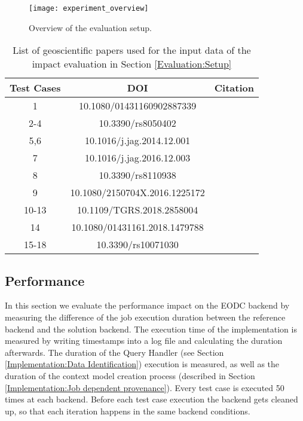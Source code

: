 \documentclass[draft,final]{vutinfth} %
\begin{document}
\begin{figure}[h]
	\centering
	\texttt{[image: experiment\_overview]}
	\caption{Overview of the evaluation setup.}
	\label{fig:experiment_overview} %
\end{figure}

\begin{table}[]
	\caption{List of geoscientific papers used for the input data of the impact evaluation in Section \ref{Evaluation:Setup}}
	\centering
	\begin{tabular}{c|c|c}
		\textbf{Test Cases} & \textbf{DOI} & \textbf{Citation}  \\ \hline
		1 & 10.1080/01431160902887339 & \cite{evaluation1} \\ 
		2-4 & 10.3390/rs8050402 & \cite{evaluation2} \\ 
		5,6 & 10.1016/j.jag.2014.12.001  & \cite{evaluation3} \\
		7 & 10.1016/j.jag.2016.12.003  & \cite{evaluation4} \\
		8 & 10.3390/rs8110938  & \cite{evaluation5} \\
		9 & 10.1080/2150704X.2016.1225172  & \cite{evaluation6} \\
		10-13 & 10.1109/TGRS.2018.2858004  & \cite{evaluation7} \\
		14 & 10.1080/01431161.2018.1479788  & \cite{evaluation8} \\
		15-18 & 10.3390/rs10071030  & \cite{evaluation9} \\
	\end{tabular}
	\label{Tab:appendix}
\end{table}

\subsection{Performance}\label{Evaluation:impact_perf}

In this section we evaluate the performance impact on the EODC backend by measuring the difference of the job execution duration between the reference backend and the solution backend. The execution time of the implementation is measured by writing timestamps into a log file and calculating the duration afterwards. The duration of the Query Handler (see Section \ref{Implementation:Data Identification}) execution is measured, as well as the duration of the context model creation process (described in Section \ref{Implementation:Job dependent provenance}). Every test case is executed 50 times at each backend. Before each test case execution the backend gets cleaned up, so that each iteration happens in the same backend conditions.  
\end{document}
